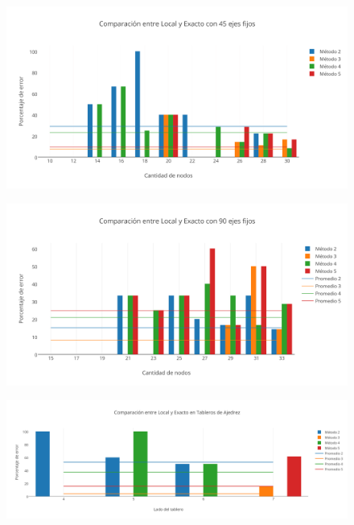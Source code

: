 \newpage

  \begin{figure}[h!]
   \begin{center}
 	\includegraphics[scale=0.7]{imagenes/local/exacto/45ejes.png}
   \end{center}
 \end{figure} 
 
  \begin{figure}[h!]
   \begin{center}
 	\includegraphics[scale=0.7]{imagenes/local/exacto/90ejes.png}
   \end{center}
 \end{figure} 
 
 \newpage
  \begin{figure}[h!]
   \begin{center}
 	\includegraphics[scale=0.55]{imagenes/local/exacto/tableros.png}
   \end{center}
 \end{figure} 
 
